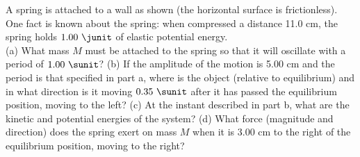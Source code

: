 A spring is attached to a wall as shown (the horizontal surface is
frictionless). One fact is known about the spring: when compressed a
distance 11.0 cm, the spring holds $1.00\ \junit$ of elastic
potential energy.\\
%
(a) What mass $M$ must be attached to the spring so that it will
oscillate with a period of $1.00\ \sunit$?\answercheck\hwendpart
%
(b) If the amplitude of the motion is 5.00 cm and the period is that
specified in part a, where is the object (relative to equilibrium)
and in what direction is it moving $0.35\ \sunit$ after it has passed
the equilibrium position, moving to the left?\answercheck\hwendpart
%
(c) At the instant described in part b, what are the kinetic and
potential energies of the system?\answercheck\hwendpart
%
(d) What force (magnitude and direction) does the spring exert on
mass $M$ when it is 3.00 cm to the right of the equilibrium position,
moving to the right?
